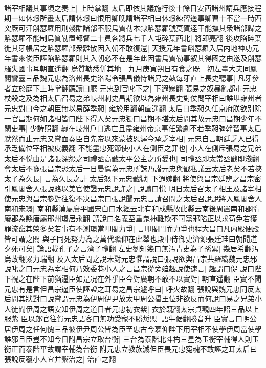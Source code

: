 諸宰相議其事頃之奏上|{
	上時掌翻}
太后即依其議施行後十餘日安西諸州請兵應接程期一如休璟所畫太后謂休璟曰恨用卿晩謂諸宰相曰休璟練習邊事卿曹十不當一時西突厥可汗斛瑟羅用刑殘酷諸部不服烏質勒本隸斛瑟羅號莫賀逹干能撫其衆諸部歸之斛瑟羅不能制烏質勒置都督二十員各將兵七千人屯碎葉西北|{
	將即亮翻}
後攻陷碎葉徙其牙帳居之斛瑟羅部衆離散因入朝不敢復還|{
	天授元年書斛瑟羅入居内地神功元年書來俊臣誣陷斛瑟羅則其入朝必不在是年此因書烏質勒事叙其得國之由遂及斛瑟羅失國事耳朝直遥翻}
烏質勒悉併其地　九月庚寅朔日有食之既　初左臺大夫同鳳閣鸞臺三品魏元忠為洛州長史洛陽令張昌儀恃諸兄之埶每牙直上長史聽事|{
	凡牙參者立於庭下上時掌翻聽讀曰廳}
元忠到官叱下之|{
	下遐嫁翻}
張易之奴暴亂都市元忠杖殺之及為相太后召易之弟岐州刺史昌期欲以為雍州長史對仗問宰相曰誰堪雍州者元忠對曰今之朝臣無以易薛季昶|{
	雍於用翻朝直遥翻}
太后曰季昶久任京府朕欲别除一官昌期何如諸相皆曰陛下得人矣元忠獨曰昌期不堪太后問其故元忠曰昌期少年不閑吏事|{
	少詩照翻}
曏在岐州戶口逃亡且盡雍州帝京事任繁劇不若季昶彊幹習事太后默然而止元忠又嘗面奏臣自先帝以來蒙被恩渥今承乏宰相|{
	元忠自言朝廷乏人已得承乏備位宰相被皮義翻}
不能盡忠死節使小人在側臣之罪也|{
	小人在側斥張易之兄弟}
太后不悦由是諸張深怨之司禮丞高戩太平公主之所愛也|{
	司禮丞即太常丞戩即淺翻}
會太后不豫張昌宗恐太后一日晏駕為元忠所誅乃譛元忠與戩私議云太后老矣不若挾太子為久長|{
	言為久長之計}
太后怒下元忠戩獄|{
	下遐嫁翻}
將使與昌宗廷辨之昌宗密引鳳閣舍人張說賂以美官使證元忠說許之|{
	說讀曰悦}
明日太后召太子相王及諸宰相使元忠與昌宗參對往復不决昌宗曰張說聞元忠言請召問之太后召說說將入鳳閣舍人南和宋璟|{
	南和縣漢屬廣平國宋白曰水經云北有和成縣故此縣云南後周置南和郡隋廢郡為縣唐屬邢州璟居永翻}
謂說曰名義至重鬼神難欺不可黨邪陷正以求苟免若獲罪流竄其榮多矣若事有不測璟當叩閤力爭|{
	言叩閤門而力爭也程大昌曰凡内殿便殿皆可謂之閤}
與子同死努力為之萬代聸仰在此舉也殿中侍御史濟源張廷珪曰朝聞道夕死可矣|{
	論語載孔子之言濟子禮翻}
左史劉知幾曰無汚青史為子孫累|{
	幾居希翻汚烏故翻累力瑞翻}
及入太后問之說未對元忠懼謂說曰張說欲與昌宗共羅織魏元忠邪說叱之曰元忠為宰相何乃效委巷小人之言昌宗從旁廹趣說使速言|{
	趣謂曰促}
說曰陛下視之在陛下前猶逼臣如是况在外乎臣今對廣朝不敢不以實對|{
	朝直遥翻}
臣實不聞元忠有是言但昌宗逼臣使誣證之耳易之昌宗遽呼曰|{
	呼火故翻}
張說與魏元忠同反太后問其狀對曰說嘗謂元忠為伊周伊尹放太甲周公攝王位非欲反而何說曰易之兄弟小人徒聞伊周之語安知伊周之道日者元忠初衣紫|{
	衣於既翻太宗貞觀四年詔三品以上服紫}
臣以郎官往賀元忠語客曰無功受寵不勝慙愳|{
	語牛倨翻勝音升}
臣實言曰明公居伊周之任何愧三品彼伊尹周公皆為臣至忠古今慕仰陛下用宰相不使學伊周當使學誰邪且臣豈不知今日附昌宗立取台衡|{
	三台為泰階北斗杓三星為玉衡宰輔得人則玉衡正而泰階平故謂宰輔為台衡}
附元忠立教族滅但臣畏元忠寃魂不敢誣之耳太后曰張說反覆小人宜并繫治之|{
	治直之翻}
